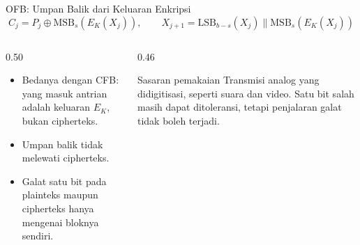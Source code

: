 \documentclass[aspectratio=169,11pt]{beamer}
\begin{document}
\begin{frame}{OFB: Umpan Balik dari Keluaran Enkripsi}
    \footnotesize
    \[
        C_j = P_j \oplus \mathrm{MSB}_s(E_K(X_j)), \qquad
        X_{j+1} = \mathrm{LSB}_{b-s}(X_j) \parallel
        \mathrm{MSB}_s(E_K(X_j))
    \]
    \begin{columns}[T,onlytextwidth]
        \begin{column}{0.50\textwidth}
            \begin{itemize}
                \item Bedanya dengan CFB: yang masuk antrian adalah
                      keluaran $E_K$, bukan cipherteks.
                \item Umpan balik tidak melewati cipherteks.
                \item Galat satu bit pada plainteks maupun cipherteks
                      hanya mengenai bloknya sendiri.
            \end{itemize}
        \end{column}
        \begin{column}{0.46\textwidth}
            \begin{exampleblock}{Sasaran pemakaian}
                \footnotesize
                Transmisi analog yang didigitisasi, seperti suara dan
                video. Satu bit salah masih dapat ditoleransi, tetapi
                penjalaran galat tidak boleh terjadi.
            \end{exampleblock}
        \end{column}
    \end{columns}
\end{frame}
\end{document}
